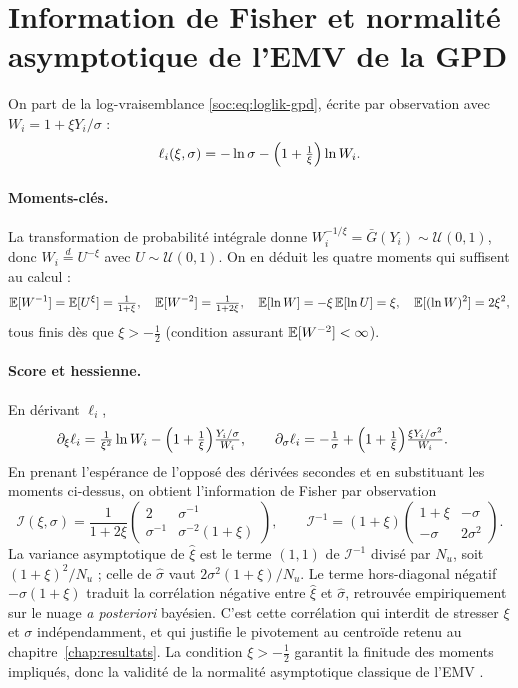 \section{Information de Fisher et normalité asymptotique de l'EMV de la GPD}
\label{soc:ann:fisher}
On part de la log-vraisemblance \eqref{soc:eq:loglik-gpd}, écrite par observation avec $W_i=1+\xi Y_i/\sigma$ :
\begin{equation}
\ell_i(\xi,\sigma)=-\ln\sigma-\Bigl(1+\tfrac1\xi\Bigr)\ln W_i.
\end{equation}

\paragraph{Moments-clés.} La transformation de probabilité intégrale donne $W_i^{-1/\xi}=\bar G(Y_i)\sim\mathcal U(0,1)$, donc $W_i\overset{d}{=}U^{-\xi}$ avec $U\sim\mathcal U(0,1)$. On en déduit les quatre moments qui suffisent au calcul :
\begin{equation}
\mathbb{E}[W^{-1}]=\mathbb{E}[U^{\xi}]=\tfrac{1}{1+\xi},\quad
\mathbb{E}[W^{-2}]=\tfrac{1}{1+2\xi},\quad
\mathbb{E}[\ln W]=-\xi\,\mathbb{E}[\ln U]=\xi,\quad
\mathbb{E}[(\ln W)^2]=2\xi^2,
\end{equation}
tous finis dès que $\xi>-\tfrac12$ (condition assurant $\mathbb{E}[W^{-2}]<\infty$).

\paragraph{Score et hessienne.} En dérivant $\ell_i$,
\begin{align*}
\partial_\xi\ell_i&=\tfrac{1}{\xi^2}\ln W_i-\Bigl(1+\tfrac1\xi\Bigr)\tfrac{Y_i/\sigma}{W_i},\qquad
\partial_\sigma\ell_i=-\tfrac1\sigma+\Bigl(1+\tfrac1\xi\Bigr)\tfrac{\xi Y_i/\sigma^2}{W_i}.
\end{align*}
En prenant l'espérance de l'opposé des dérivées secondes et en substituant les moments ci-dessus, on obtient l'information de Fisher par observation
\begin{equation}
\mathcal{I}(\xi,\sigma)=\frac{1}{1+2\xi}\begin{pmatrix} 2 & \sigma^{-1}\\[2pt] \sigma^{-1} & \sigma^{-2}(1+\xi)\end{pmatrix},\qquad
\mathcal{I}^{-1}=(1+\xi)\begin{pmatrix} 1+\xi & -\sigma\\[2pt] -\sigma & 2\sigma^2\end{pmatrix}.
\end{equation}
La variance asymptotique de $\hat\xi$ est le terme $(1,1)$ de $\mathcal I^{-1}$ divisé par $N_u$, soit $(1+\xi)^2/N_u$ ; celle de $\hat\sigma$ vaut $2\sigma^2(1+\xi)/N_u$. Le terme hors-diagonal négatif $-\sigma(1+\xi)$ traduit la corrélation négative entre $\hat\xi$ et $\hat\sigma$, retrouvée empiriquement sur le nuage \emph{a posteriori} bayésien. C'est cette corrélation qui interdit de stresser $\xi$ et $\sigma$ indépendamment, et qui justifie le pivotement au centroïde retenu au chapitre~\ref{chap:resultats}. La condition $\xi>-\tfrac12$ garantit la finitude des moments impliqués, donc la validité de la normalité asymptotique classique de l'EMV \citep{smith1987}.


